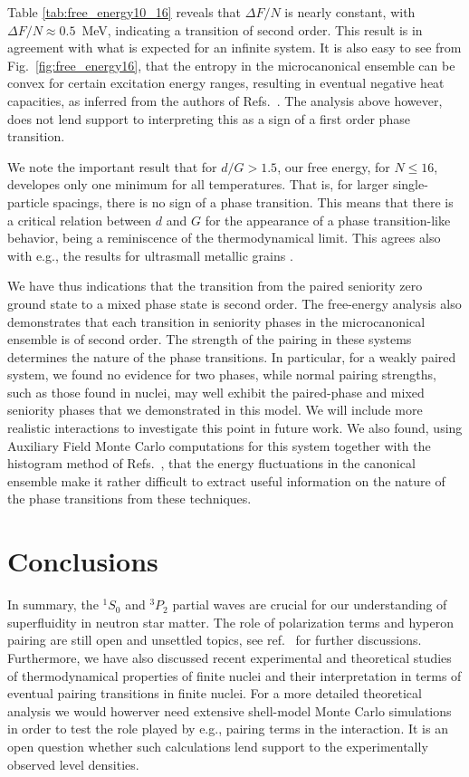 \documentclass{elsart}
\begin{document}
Table \ref{tab:free_energy10_16} reveals that $\Delta F/N$ is nearly
constant, with  $\Delta F/N\approx 0.5$~MeV, indicating a 
transition of second order. This result is in 
agreement with what is expected for an infinite system. 
It is also easy to see from Fig.~\ref{fig:free_energy16},
that the entropy in the microcanonical ensemble can be convex for 
certain excitation energy ranges, resulting in eventual negative 
heat capacities, as inferred from the 
authors of Refs.~\cite{huller,gross}. The analysis
above however, does not lend
support to interpreting this as a sign of a first order phase transition.

We note the important result that for $d/G > 1.5$, 
our free energy, for $N\le 16$, developes
only one minimum for all temperatures. That is, for larger single-particle
spacings, there is no sign of a phase transition. This means that there
is a critical relation between $d$ and $G$ for the appearance of a phase 
transition-like behavior, being a  reminiscence of the thermodynamical limit.
This agrees also with e.g., the results for ultrasmall metallic grains
\cite{delft2000}. 

We have thus indications that the transition from the paired seniority
zero ground state to a mixed phase state is second order. The free-energy
analysis also demonstrates that each transition in seniority phases in 
the microcanonical ensemble is of second order. The strength of the
pairing in these systems determines the nature of the phase transitions. 
In particular, for a weakly paired system, we found no evidence 
for two phases, while normal pairing strengths, such as those
found in nuclei, may well exhibit the paired-phase and mixed seniority
phases that we demonstrated in this model. We will include more realistic
interactions to investigate this point in future work. 
We also found, using Auxiliary Field Monte Carlo 
computations for this system \cite{KD97} together 
with the histogram method of Refs.~\cite{prl90,fs88}, that the energy
fluctuations in the canonical ensemble 
make it rather difficult to extract useful information
on the nature of the phase transitions from these techniques. 

\section{Conclusions} \label{sec:sec5}
In summary, the $^1S_0$ and $^3P_2$ partial waves are crucial for our
understanding of superfluidity in neutron star matter. The role of polarization terms 
and hyperon pairing are
still open and unsettled topics, see ref.~\cite{dh2003} for further discussions.
Furthermore, we have also discussed 
recent experimental and theoretical studies 
of thermodynamical properties of finite nuclei
and their interpretation in terms  of eventual pairing transitions 
in finite nuclei. For a more detailed theoretical analysis we would howerver need 
extensive shell-model Monte Carlo simulations in order to test the
role played by e.g., pairing terms in the interaction. It is an open question whether
such calculations lend support to the experimentally observed   
level densities. 
\end{document}

